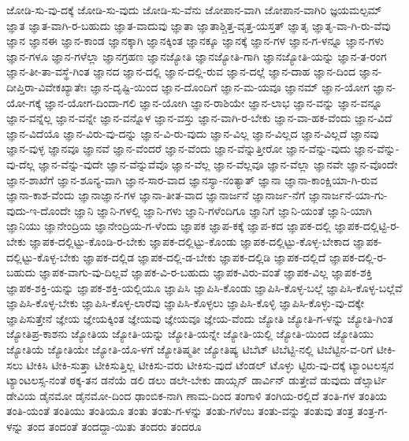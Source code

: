 {ಜೋಡಿ-ಸು-ವು-ದಕ್ಕೆ
ಜೋಡಿ-ಸು-ವುದು
ಜೋಡಿ-ಸು-ವೆನು
ಜೋಪಾನ-ವಾಗಿ
ಜೋಪಾನ-ವಾಗಿರಿ
ಜ್ಞಯಮಲ್ಪಮ್
ಜ್ಞಾತ
ಜ್ಞಾತ-ವಾಗಿ-ರ-ಬಹುದು
ಜ್ಞಾತ-ವಾದುವು
ಜ್ಞಾತಾ
ಜ್ಞಾತಾಶ್ಚಿತ್ತ-ವೃತ್ತ-ಯಸ್ತತ್
ಜ್ಞಾತೃ
ಜ್ಞಾತೃ-ವಾ-ಗಿ-ರು-ವೆವು
ಜ್ಞಾನ
ಜ್ಞಾನಈ
ಜ್ಞಾನ-ಕಾಂಡ
ಜ್ಞಾನಕ್ಕಾಗಿ
ಜ್ಞಾನಕ್ಕಿಂತ
ಜ್ಞಾನಕ್ಕೂ
ಜ್ಞಾನಕ್ಕೆ
ಜ್ಞಾನ-ಗಳ
ಜ್ಞಾನ-ಗ-ಳನ್ನೂ
ಜ್ಞಾನ-ಗಳು
ಜ್ಞಾನ-ಗಳೂ
ಜ್ಞಾನ-ಗಳೆಲ್ಲಾ
ಜ್ಞಾನಗ್ರಹಣ
ಜ್ಞಾನಜ್ಯೋತಿ
ಜ್ಞಾನಜ್ಯೋತಿ-ಗಾಗಿ
ಜ್ಞಾನಜ್ಯೋತಿ-ಯನ್ನು
ಜ್ಞಾನ-ತ-ರಂಗ
ಜ್ಞಾನ-ತೀ-ತಾ-ವಸ್ಥೆ-ಗಿಂತ
ಜ್ಞಾನದ
ಜ್ಞಾನ-ದಲ್ಲಿ
ಜ್ಞಾನ-ದಲ್ಲಿ-ರುವ
ಜ್ಞಾನ-ದಲ್ಲೆ
ಜ್ಞಾನ-ದಾಹ
ಜ್ಞಾನ-ದಿಂದ
ಜ್ಞಾನ-ದೀಪ್ತಿರಾ-ವಿವೇಕಖ್ಯಾತೇಃ
ಜ್ಞಾನ-ದೃಷ್ಟಿ-ಯಿಂದ
ಜ್ಞಾನ-ದೊಂದಿಗೆ
ಜ್ಞಾನ-ಮ-ಯವೂ
ಜ್ಞಾನಮ್
ಜ್ಞಾನ-ಯೋಗ
ಜ್ಞಾನ-ಯೋ-ಗಕ್ಕೆ
ಜ್ಞಾನ-ಯೋಗ-ದಿಂದಾ-ಗಲಿ
ಜ್ಞಾನ-ಯೋಗಿ
ಜ್ಞಾನ-ರಾಶಿಯೇ
ಜ್ಞಾನ-ಲಾಭ
ಜ್ಞಾನ-ವನ್ನು
ಜ್ಞಾನ-ವನ್ನೂ
ಜ್ಞಾನ-ವನ್ನೆಲ್ಲ
ಜ್ಞಾನ-ವನ್ನೇ
ಜ್ಞಾನ-ವನ್ನೊಳ
ಜ್ಞಾನ-ವಸ್ತು
ಜ್ಞಾನ-ವಾಗಿ-ರ-ಬೇಕು
ಜ್ಞಾನ-ವಾ-ಹಕ-ವೆಂದು
ಜ್ಞಾನ-ವಿದೆ
ಜ್ಞಾನ-ವಿದೆಯೊ
ಜ್ಞಾನ-ವಿರು-ವು-ದನ್ನು
ಜ್ಞಾನ-ವಿ-ರು-ವುದು
ಜ್ಞಾನ-ವಿಲ್ಲ
ಜ್ಞಾನ-ವಿಲ್ಲದ
ಜ್ಞಾನ-ವಿಲ್ಲದೆ
ಜ್ಞಾನವು
ಜ್ಞಾನ-ವುಳ್ಳ
ಜ್ಞಾನವೂ
ಜ್ಞಾನವೆ
ಜ್ಞಾನ-ವೆಂದರೆ
ಜ್ಞಾನ-ವೆಂದು
ಜ್ಞಾನ-ವೆನ್ನುತ್ತೀರೋ
ಜ್ಞಾನ-ವೆನ್ನು-ವುದು
ಜ್ಞಾನ-ವೆನ್ನು-ವು-ದೆಲ್ಲ
ಜ್ಞಾನ-ವೆನ್ನು-ವುದೇ
ಜ್ಞಾನ-ವೆನ್ನುವೆವೊ
ಜ್ಞಾನ-ವೆಲ್ಲ
ಜ್ಞಾನ-ವೆಲ್ಲವೂ
ಜ್ಞಾನ-ವೆಲ್ಲಾ
ಜ್ಞಾನವೇ
ಜ್ಞಾನ-ವೊಂದೇ
ಜ್ಞಾನ-ಶಾಖೆಗೆ
ಜ್ಞಾನ-ಶೂನ್ಯ-ವಾಗಿ
ಜ್ಞಾನ-ಸಾರ-ವಾದ
ಜ್ಞಾನಸ್ಯಾ-ನಂತ್ಯಾತ್
ಜ್ಞಾನಾ
ಜ್ಞಾನಾ-ಕಾಂಕ್ಷಿಯಾ-ಗಿ-ರುವ
ಜ್ಞಾನಾ-ಕಾಶ-ವೆಂದು
ಜ್ಞಾನಾಜ್ಞಾನ-ಗಳ
ಜ್ಞಾನಾ-ತೀತ-ವಾದ
ಜ್ಞಾನಾರ್ಜನೆ
ಜ್ಞಾನಾರ್ಜ-ನೆಗೆ
ಜ್ಞಾನಾರ್ಜನೆ-ಯಾ-ಗು-ವುದು-ಇ-ದೊಂದೇ
ಜ್ಞಾನಿ
ಜ್ಞಾನಿ-ಗಳಲ್ಲಿ
ಜ್ಞಾನಿ-ಗಳು
ಜ್ಞಾನಿ-ಗಳೆಂದಿಗೂ
ಜ್ಞಾನಿಗೆ
ಜ್ಞಾನಿ-ಯಂತೆ
ಜ್ಞಾನಿ-ಯಾಗಿ
ಜ್ಞಾನಿಯು
ಜ್ಞಾನೇಂದ್ರಿಯ
ಜ್ಞಾನೇಂದ್ರಿಯ-ಗ-ಳೆಂದು
ಜ್ಞಾಪಕ
ಜ್ಞಾಪ-ಕಕ್ಕೆ
ಜ್ಞಾಪ-ಕದ
ಜ್ಞಾಪಕ-ದಲ್ಲಿ
ಜ್ಞಾಪಕ-ದಲ್ಲಿಟ್ಟಿ-ರ-ಬೇಕು
ಜ್ಞಾಪಕ-ದಲ್ಲಿಟ್ಟು-ಕೊಂಡಿ-ರ-ಬೇಕು
ಜ್ಞಾಪಕ-ದಲ್ಲಿಟ್ಟು-ಕೊಂಡು
ಜ್ಞಾಪಕ-ದಲ್ಲಿಟ್ಟು-ಕೊಳ್ಳ-ಬೇಕಾದ
ಜ್ಞಾಪಕ-ದಲ್ಲಿಟ್ಟು-ಕೊಳ್ಳ-ಬೇಕು
ಜ್ಞಾಪಕ-ದಲ್ಲಿಡ
ಜ್ಞಾಪಕ-ದಲ್ಲಿ-ಡ-ಬೇಕು
ಜ್ಞಾಪಕ-ದಲ್ಲಿಡಿ
ಜ್ಞಾಪಕ-ದಲ್ಲಿದೆ
ಜ್ಞಾಪಕ-ದಲ್ಲಿ-ರ-ಬಹುದು
ಜ್ಞಾಪಕ-ವಾಗು-ವು-ದಿಲ್ಲವೆ
ಜ್ಞಾಪಕ-ವಿ-ರ-ಬಹುದು
ಜ್ಞಾಪಕ-ವಿರು-ವಂತೆ
ಜ್ಞಾಪಕ-ವಿಲ್ಲ
ಜ್ಞಾಪಕ-ಶಕ್ತಿ
ಜ್ಞಾಪಕ-ಶಕ್ತಿ-ಯನ್ನು
ಜ್ಞಾಪಕ-ಶಕ್ತಿ-ಯಲ್ಲಿಯೂ
ಜ್ಞಾಪಿಸಿ
ಜ್ಞಾಪಿಸಿ-ಕೊಂಡು
ಜ್ಞಾಪಿಸಿ-ಕೊಳ್ಳ-ಬಲ್ಲೆ
ಜ್ಞಾಪಿಸಿ-ಕೊಳ್ಳ-ಬಲ್ಲೆವೆ
ಜ್ಞಾಪಿಸಿ-ಕೊಳ್ಳ-ಬೇಕು
ಜ್ಞಾಪಿಸಿ-ಕೊಳ್ಳ-ಲಾರೆವು
ಜ್ಞಾಪಿಸಿ-ಕೊಳ್ಳಲು
ಜ್ಞಾಪಿಸಿ-ಕೊಳ್ಳಿ
ಜ್ಞಾಪಿಸಿ-ಕೊಳ್ಳು-ವು-ದಕ್ಕೇ
ಜ್ಞಾಪಿಸುತ್ತೇನೆ
ಜ್ಞೇಯ
ಜ್ಞೇಯಕ್ಕಿಂತ
ಜ್ಞೇಯವು
ಜ್ಞೇಯವೂ
ಜ್ಞೇಯ-ವೆಂದು
ಜ್ಯೋತಿ
ಜ್ಯೋತಿ-ಗ-ಳನ್ನು
ಜ್ಯೋತಿ-ಗಿಂತ
ಜ್ಯೋತಿಪ್ರ-ಕಾಶನು
ಜ್ಯೋತಿಯ
ಜ್ಯೋತಿ-ಯನ್ನು
ಜ್ಯೋತಿ-ಯನ್ನೇ
ಜ್ಯೋತಿ-ಯಲ್ಲಿ
ಜ್ಯೋತಿ-ಯಿಂದ
ಜ್ಯೋತಿಯು
ಜ್ಯೋತಿಯೆ
ಜ್ಯೋತಿಯೇ
ಜ್ಯೋತಿ-ಯೊ-ಳಗೆ
ಜ್ಯೋತಿಷ್ಮತೀ
ಜ್ಯೋತಿಷ್ಯ
ಟಿಬೆಟ್
ಟಿಬೆಟ್ಟಿ-ನಲ್ಲಿ
ಟಿಬೆಟ್ಟಿನ-ವ-ರಿಗೆ
ಟೀಕಿ-ಸಲು
ಟೀಕಿಸಿ
ಟೀಕಿ-ಸುತ್ತಾ
ಟೀಕಿಸುತ್ತಿಲ್ಲ
ಟೀಕಿಸು-ವರು
ಟೀಕಿಸು-ವುದೆ
ಟೆಂಡಲ್
ಟೊಳ್ಳು
ಟ್ಟಿರು-ವು-ದಕ್ಕೆ
ಟ್ಯಾಂಟಲಸ್ಸನ
ಟ್ಯಾಂಟಲಸ್ಸ-ನಂತೆ
ಠಕ್ಕ-ತನ
ಡನೆಯೆ
ಡಲಿ
ಡಲು
ಡಲೇ-ಬೇಕು
ಡಾಯ್ಸನ್
ಡಾರ್ವಿನ್
ಡುತ್ತೇವೆ
ಡುವುದು
ಡೆಲ್ಸಾರ್ಟಿ
ಡೇವಿಯ
ಡೈನಮೋ
ಡೈನಮೋ-ದಿಂದ
ಢಾಂಬಿಕ-ನಾಗಿ
ಣಾಮ-ದಿಂದ
ತಂಗಾಳಿ
ತಂಗಿಯ-ರಲ್ಲಿದೆ
ತಂತಿ-ಗಳ
ತಂತಿಯ
ತಂತಿ-ಯಂತೆ
ತಂತಿಯು
ತಂತಿಯೂ
ತಂತು
ತಂತು-ಗ-ಳನ್ನು
ತಂತು-ಗಳೆಂಬ
ತಂತು-ವನ್ನು
ತಂತುವು
ತಂತ್ರ
ತಂತ್ರ-ಗ-ಳನ್ನು
ತಂದ
ತಂದಂತೆ
ತಂದದ್ದಾ-ಯಿತು
ತಂದರು
ತಂದರೂ
}
